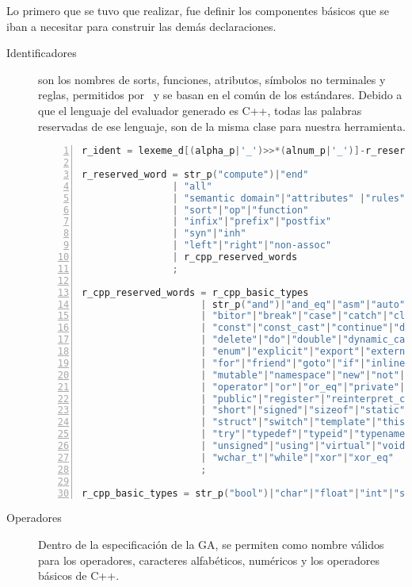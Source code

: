 Lo primero que se tuvo que realizar, fue definir los componentes básicos que se iban a necesitar para construir las demás declaraciones.

\begin{description}
\item [Identificadores] son los nombres de sorts, funciones, atributos, símbolos no terminales y reglas, permitidos por \maggen\ y se basan en el común de los estándares. Debido a que el lenguaje del evaluador generado es C++, todas las palabras reservadas de ese lenguaje, son de la misma clase para nuestra herramienta.

\begin{lstlisting}[language=C++, basicstyle=\scriptsize, numbers=left, numbersep=5pt, numberstyle=\tiny]
r_ident = lexeme_d[(alpha_p|'_')>>*(alnum_p|'_')]-r_reserved_word;

r_reserved_word = str_p("compute")|"end"
                | "all"
                | "semantic domain"|"attributes" |"rules"
                | "sort"|"op"|"function"
                | "infix"|"prefix"|"postfix"
                | "syn"|"inh"
                | "left"|"right"|"non-assoc"
                | r_cpp_reserved_words
                ;

r_cpp_reserved_words = r_cpp_basic_types
                     | str_p("and")|"and_eq"|"asm"|"auto"|"bitand"
                     | "bitor"|"break"|"case"|"catch"|"class"|"compl"
                     | "const"|"const_cast"|"continue"|"default"
                     | "delete"|"do"|"double"|"dynamic_cast"|"else"
                     | "enum"|"explicit"|"export"|"extern"|"false"
                     | "for"|"friend"|"goto"|"if"|"inline"|"long"
                     | "mutable"|"namespace"|"new"|"not"|"not_eq"
                     | "operator"|"or"|"or_eq"|"private"|"protected"
                     | "public"|"register"|"reinterpret_cast"|"return"
                     | "short"|"signed"|"sizeof"|"static"|"static_cast"
                     | "struct"|"switch"|"template"|"this"|"throw"|"true"
                     | "try"|"typedef"|"typeid"|"typename"|"union"
                     | "unsigned"|"using"|"virtual"|"void"|"volatile"
                     | "wchar_t"|"while"|"xor"|"xor_eq"
                     ;

r_cpp_basic_types = str_p("bool")|"char"|"float"|"int"|"string";
\end{lstlisting}

\item [Operadores] Dentro de la especificación de la GA, se permiten como nombre válidos para los operadores, caracteres alfabéticos, numéricos y los operadores básicos de C++. 


\end{description}

